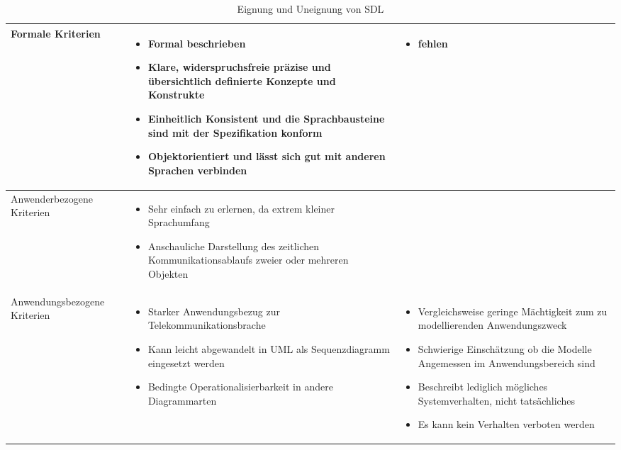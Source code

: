 \begin{table}[ht]
	\begin{tabularx}{\textwidth}{|l|X|X|}
		\hline
		Formale	Kriterien &
		\begin{itemize}
			\item Formal beschrieben
			\item Klare, widerspruchsfreie präzise und übersichtlich definierte Konzepte und Konstrukte
			\item Einheitlich Konsistent und die Sprachbausteine sind mit der Spezifikation konform
			\item Objektorientiert und lässt sich gut mit anderen Sprachen verbinden
		\end{itemize}  & 
		\begin{itemize}
			\item fehlen
		\end{itemize} \\
	\hline
	Anwenderbezogene Kriterien &
	\begin{itemize}
		\item Sehr einfach zu erlernen, da extrem kleiner Sprachumfang
		\item Anschauliche Darstellung des zeitlichen Kommunikationsablaufs zweier oder mehreren Objekten
	\end{itemize}  &  \\
		\hline
	Anwendungsbezogene Kriterien &
		\begin{itemize}
			\item Starker Anwendungsbezug zur Telekommunikationsbrache
			\item Kann leicht abgewandelt in UML als Sequenzdiagramm eingesetzt werden
			\item Bedingte Operationalisierbarkeit in andere Diagrammarten
		\end{itemize}  & 
		\begin{itemize}
			\item Vergleichsweise geringe Mächtigkeit zum zu modellierenden Anwendungszweck
			\item Schwierige Einschätzung ob die Modelle Angemessen im Anwendungsbereich sind
			\item Beschreibt lediglich mögliches Systemverhalten, nicht tatsächliches
			\item Es kann kein Verhalten verboten werden
		\end{itemize} \\
		\hline
	\end{tabularx} 
	\caption{Eignung und Uneignung von SDL}
	\label{tab:EignungSDL}
\end{table} 
